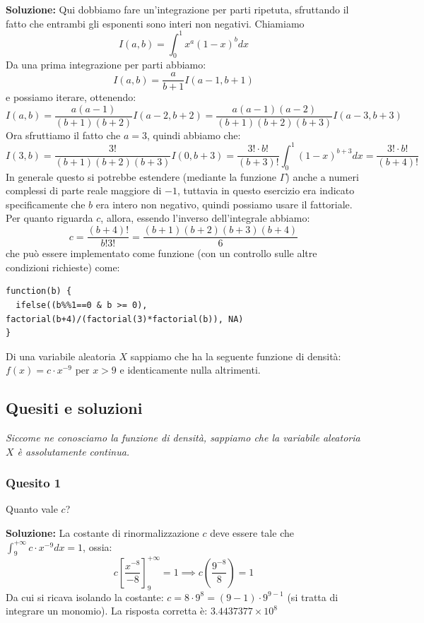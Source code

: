 \documentclass[12pt, a4paper]{article}
\begin{document}
\textbf{Soluzione:}
Qui dobbiamo fare un’integrazione per parti ripetuta, sfruttando il fatto che entrambi gli esponenti sono interi non negativi. Chiamiamo
$$ I(a,b) = \int_0^1 x^a(1-x)^b dx $$
Da una prima integrazione per parti abbiamo:
$$ I(a,b) = \frac{a}{b+1} I(a-1, b+1) $$
e possiamo iterare, ottenendo:
$$ I(a,b) = \frac{a(a-1)}{(b+1)(b+2)} I(a-2, b+2) = \frac{a(a-1)(a-2)}{(b+1)(b+2)(b+3)} I(a-3, b+3) $$
Ora sfruttiamo il fatto che $a=3$, quindi abbiamo che:
$$ I(3,b) = \frac{3!}{(b+1)(b+2)(b+3)} I(0,b+3) = \frac{3! \cdot b!}{(b+3)!} \int_0^1 (1-x)^{b+3} dx = \frac{3! \cdot b!}{(b+4)!} $$
In generale questo si potrebbe estendere (mediante la funzione $\Gamma$) anche a numeri complessi di parte reale maggiore di $-1$, tuttavia in questo esercizio era indicato specificamente che $b$ era intero non negativo, quindi possiamo usare il fattoriale.
Per quanto riguarda $c$, allora, essendo l'inverso dell'integrale abbiamo:
$$ c = \frac{(b+4)!}{b! 3!} = \frac{(b+1)(b+2)(b+3)(b+4)}{6} $$
che può essere implementato come funzione (con un controllo sulle altre condizioni richieste) come:
\begin{verbatim}
function(b) {
  ifelse((b%%1==0 & b >= 0), factorial(b+4)/(factorial(3)*factorial(b)), NA)
}
\end{verbatim}


\vspace{0.5cm}
\begin{tcolorbox}[colback=lightergray!10, colframe=tocsec, title=\textbf{Esercizio 2}]
Di una variabile aleatoria $X$ sappiamo che ha la seguente funzione di densità: $f(x)=c \cdot x^{-9}$ per $x>9$ e identicamente nulla altrimenti.
\end{tcolorbox}

\subsection*{Quesiti e soluzioni}
\textit{Siccome ne conosciamo la funzione di densità, sappiamo che la variabile aleatoria $X$ è assolutamente continua.}

\subsubsection*{Quesito 1}
Quanto vale $c$?

\textbf{Soluzione:}
La costante di rinormalizzazione $c$ deve essere tale che $\int_9^{+\infty} c \cdot x^{-9} dx = 1$, ossia:
$$ c \left[ \frac{x^{-8}}{-8} \right]_9^{+\infty} = 1 \implies c \left( \frac{9^{-8}}{8} \right) = 1 $$
Da cui si ricava isolando la costante: $c = 8 \cdot 9^8 = (9-1) \cdot 9^{9-1}$ (si tratta di integrare un monomio).
La risposta corretta è: $3.4437377 \times 10^8$
\end{document}
